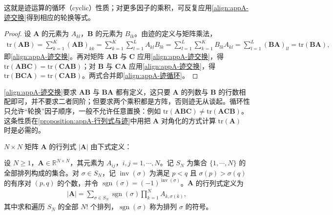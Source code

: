 \documentclass[../main.tex]{subfiles}
\begin{document}
这就是迹运算的循环（cyclic）性质；对更多因子的乘积，可反复应用\eqref{align:appA-迹交换}得到相应的轮换等式。

\begin{proof}
设 $\bm{A}$ 的元素为 $A_{kl}$，$\bm{B}$ 的元素为 $B_{lk}$。由迹的定义与矩阵乘法，
\begin{align*}
 \mathrm{tr}(\bm{A}\bm{B})=\sum_{k=1}^{K}(\bm{A}\bm{B})_{kk}=\sum_{k=1}^{K}\sum_{l=1}^{L}A_{kl}B_{lk}=\sum_{l=1}^{L}\sum_{k=1}^{K}B_{lk}A_{kl}=\sum_{l=1}^{L}(\bm{B}\bm{A})_{ll}=\mathrm{tr}(\bm{B}\bm{A}),
\end{align*}
即\eqref{align:appA-迹交换}。再对矩阵 $\bm{A}\bm{B}$ 与 $\bm{C}$ 应用\eqref{align:appA-迹交换}，得 $\mathrm{tr}(\bm{A}\bm{B}\bm{C})=\mathrm{tr}(\bm{C}\bm{A}\bm{B})$；对 $\bm{B}$ 与 $\bm{C}\bm{A}$ 应用\eqref{align:appA-迹交换}，得 $\mathrm{tr}(\bm{B}\bm{C}\bm{A})=\mathrm{tr}(\bm{C}\bm{A}\bm{B})$。两式合并即\eqref{align:appA-迹循环}。
\end{proof}

\begin{remark}
\eqref{align:appA-迹交换}要求 $\bm{A}\bm{B}$ 与 $\bm{B}\bm{A}$ 都有定义，这只要 $\bm{A}$ 的列数与 $\bm{B}$ 的行数相配即可，并不要求二者同阶；但要求两个乘积都是方阵，否则迹无从谈起。循环性只允许“轮换”因子顺序，一般不允许任意置换：例如 $\mathrm{tr}(\bm{A}\bm{B}\bm{C})\neq\mathrm{tr}(\bm{A}\bm{C}\bm{B})$。这条性质在\cref{proposition:appA-行列式与迹}中用把 $\bm{A}$ 对角化的方式计算 $\mathrm{tr}(\bm{A})$ 时是必需的。
\end{remark}

$N\times N$ 矩阵 $\bm{A}$ 的行列式 $|\bm{A}|$ 由下式定义：
\begin{definition}[行列式]\label{definition:appA-行列式}
设 $N\geqslant1$，$\bm{A}\in\mathbb{R}^{N\times N}$，其元素为 $A_{ij}$，$i,j=1,\cdots,N$。记 $S_N$ 为集合 $\{1,\cdots,N\}$ 的全部排列构成的集合。对 $\sigma\in S_N$，记 $\operatorname{inv}(\sigma)$ 为满足 $p<q$ 且 $\sigma(p)>\sigma(q)$ 的有序对 $(p,q)$ 的个数，并令 $\operatorname{sgn}(\sigma)=(-1)^{\operatorname{inv}(\sigma)}$。$\bm{A}$ 的行列式定义为
\begin{align}
  |\bm{A}|=\sum_{\sigma\in S_N}\operatorname{sgn}(\sigma)\prod_{k=1}^{N}A_{k,\sigma(k)},
  \label{align:appA-行列式定义}
\end{align}
其中求和遍历 $S_N$ 的全部 $N!$ 个排列，$\operatorname{sgn}(\sigma)$ 称为排列 $\sigma$ 的符号。
\end{definition}
\end{document}
